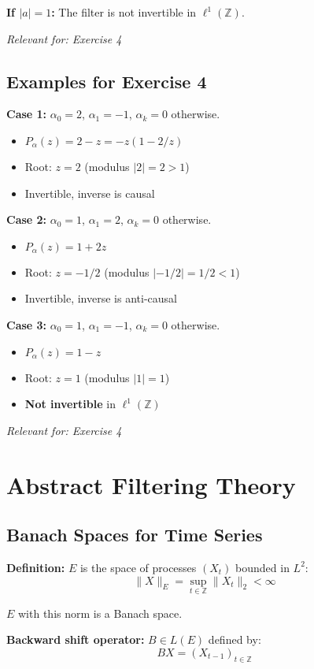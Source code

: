 \documentclass[a4paper, 12pt]{article}
\begin{document}
\textbf{If $|a| = 1$:} The filter is not invertible in $\ell^1(\mathbb{Z})$.

\textit{Relevant for: Exercise 4}

\subsection{Examples for Exercise 4}
\textbf{Case 1:} $\alpha_0 = 2$, $\alpha_1 = -1$, $\alpha_k = 0$ otherwise.
\begin{itemize}
\item $P_\alpha(z) = 2 - z = -z(1 - 2/z)$
\item Root: $z = 2$ (modulus $|2| = 2 > 1$)
\item Invertible, inverse is causal
\end{itemize}

\textbf{Case 2:} $\alpha_0 = 1$, $\alpha_1 = 2$, $\alpha_k = 0$ otherwise.
\begin{itemize}
\item $P_\alpha(z) = 1 + 2z$
\item Root: $z = -1/2$ (modulus $|-1/2| = 1/2 < 1$)
\item Invertible, inverse is anti-causal
\end{itemize}

\textbf{Case 3:} $\alpha_0 = 1$, $\alpha_1 = -1$, $\alpha_k = 0$ otherwise.
\begin{itemize}
\item $P_\alpha(z) = 1 - z$
\item Root: $z = 1$ (modulus $|1| = 1$)
\item \textbf{Not invertible} in $\ell^1(\mathbb{Z})$
\end{itemize}

\textit{Relevant for: Exercise 4}

\section{Abstract Filtering Theory}

\subsection{Banach Spaces for Time Series}
\textbf{Definition:} $E$ is the space of processes $(X_t)$ bounded in $L^2$:
\[
\|X\|_E = \sup_{t \in \mathbb{Z}} \|X_t\|_2 < \infty
\]

$E$ with this norm is a Banach space.

\textbf{Backward shift operator:} $B \in L(E)$ defined by:
\[
BX = (X_{t-1})_{t \in \mathbb{Z}}
\]
\end{document}
